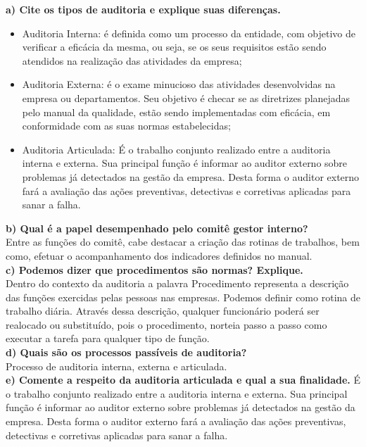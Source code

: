 \documentclass[12pt]{article}
\begin{document}
\textbf{a) Cite os tipos de auditoria e explique suas diferenças.}
\begin{itemize}
	\item Auditoria Interna: é definida como um processo da entidade, com objetivo de verificar a eficácia da mesma, ou seja, se os seus requisitos estão sendo atendidos na realização das atividades da empresa;
	\item Auditoria Externa: é o exame minucioso das atividades desenvolvidas na empresa ou departamentos. Seu objetivo é checar se as diretrizes planejadas pelo manual da qualidade, estão sendo implementadas com eficácia, em conformidade com as suas normas estabelecidas;
	\item Auditoria Articulada: É o trabalho conjunto realizado entre a auditoria interna e externa. Sua principal função é informar ao auditor externo sobre problemas já detectados na gestão da empresa. Desta forma o auditor externo fará a avaliação das ações preventivas, detectivas e corretivas aplicadas para sanar a falha.
\end{itemize}


\textbf{b) Qual é a papel desempenhado pelo comitê gestor interno?}
\\
Entre as funções do comitê, cabe destacar a criação das rotinas de trabalhos, bem como, efetuar o acompanhamento dos indicadores definidos no manual.
\\

\textbf{c) Podemos dizer que procedimentos são normas? Explique.}
\\
Dentro do contexto da auditoria a palavra Procedimento representa a descrição das funções exercidas pelas pessoas nas empresas. Podemos definir como rotina de trabalho diária. Através dessa descrição, qualquer funcionário poderá ser realocado ou substituído, pois o procedimento, norteia passo a passo como executar a tarefa para qualquer tipo de função.
\\

\textbf{d) Quais são os processos passíveis de auditoria?}
\\
Processo de auditoria interna, externa e articulada.
\\

\textbf{e) Comente a respeito da auditoria articulada e qual a sua
finalidade.}
É o trabalho conjunto realizado entre a auditoria interna e externa. Sua principal função é informar ao auditor externo sobre problemas já detectados na gestão da empresa. Desta forma o auditor externo fará a avaliação das ações preventivas, detectivas e corretivas aplicadas para sanar a falha. 
\\
\end{document}
